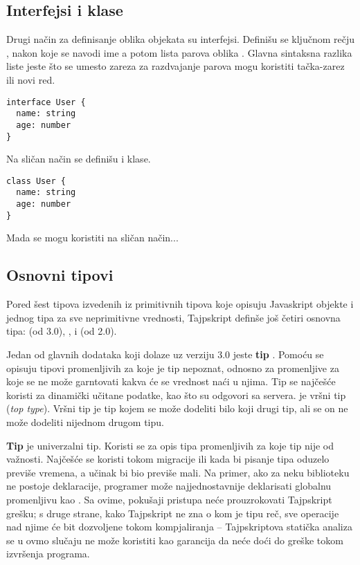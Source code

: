 \subsection{Interfejsi i klase}

Drugi način za definisanje oblika objekata su interfejsi.
Definišu se ključnom rečju , nakon koje se navodi ime a potom lista parova oblika .
Glavna sintaksna razlika liste jeste što se umesto zareza za razdvajanje parova mogu koristiti tačka-zarez ili novi red.

\begin{verbatim}
interface User {
  name: string
  age: number
}
\end{verbatim}

Na sličan način se definišu i klase.

\begin{verbatim}
class User {
  name: string
  age: number
}
\end{verbatim}

Mada se mogu koristiti na sličan način...%

\subsection{Osnovni tipovi}

Pored šest tipova izvedenih iz primitivnih tipova koje opisuju Javaskript objekte i jednog tipa za sve neprimitivne vrednosti, Tajpskript definše još četiri osnovna tipa:  (od 3.0), ,  i  (od 2.0).

Jedan od glavnih dodataka koji dolaze uz verziju 3.0 jeste \textbf{tip }.
Pomoću  se opisuju tipovi promenljivih za koje je tip nepoznat, odnosno za promenljive za koje se ne može garntovati kakva će se vrednost naći u njima.
Tip  se najčešće koristi za dinamički učitane podatke, kao što su odgovori sa servera.
 je vršni tip (\textit{top type}).
Vršni tip je tip kojem se može dodeliti bilo koji drugi tip, ali se on ne može dodeliti nijednom drugom tipu.

\textbf{Tip } je univerzalni tip.
Koristi se za opis tipa promenljivih za koje tip nije od važnosti.
Najčešće se koristi tokom migracije ili kada bi pisanje tipa oduzelo previše vremena, a učinak bi bio previše mali.
Na primer, ako za neku biblioteku ne postoje deklaracije, programer može najjednostavnije deklarisati globalnu promenljivu kao .
Sa ovime, pokušaji pristupa  neće prouzrokovati Tajpskript grešku; s druge strane, kako Tajpskript ne zna o kom je tipu reč, sve operacije nad njime će bit dozvoljene tokom kompjaliranja -- Tajpskriptova statička analiza se u ovmo slučaju ne može koristiti kao garancija da neće doći do greške tokom izvršenja programa.

